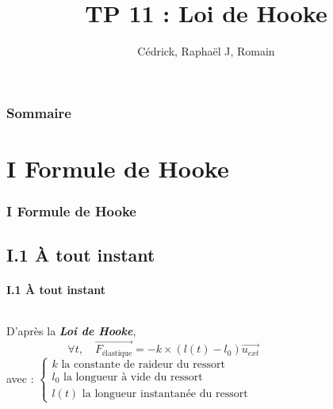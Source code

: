 \documentclass{beamer}
\title{TP 11 : Loi de Hooke}
\author{Cédrick, Raphaël J, Romain}
\date{}
\begin{document}
\frame{\titlepage}

\begin{frame}
    \frametitle{Sommaire}
    \tableofcontents
\end{frame}

\section{I Formule de Hooke}

\begin{frame}

    \frametitle{I Formule de Hooke}

    \subsection{I.1 À tout instant}
    \framesubtitle{I.1 À tout instant}

        \begin{columns}
            \begin{column}{0.75\textwidth}
            D'après la \textit{\textbf{Loi de Hooke}}, $$ \boxed{\forall t, \quad \overrightarrow{F_{\text{élastique}}} =  -k \times (l(t) - l_{0}) \overrightarrow{u_{ext}}}  $$
            avec :
            $\begin{cases} 
                k \text{ la constante de raideur du ressort} \\ 
                l_{0}  \text{ la longueur à vide du ressort} \\
                l(t) \text{ la longueur instantanée du ressort}
            \end{cases}$
            \end{column}

            \begin{column}{0.25\textwidth}
\end{column}
\end{columns}
\end{frame}
\end{document}
